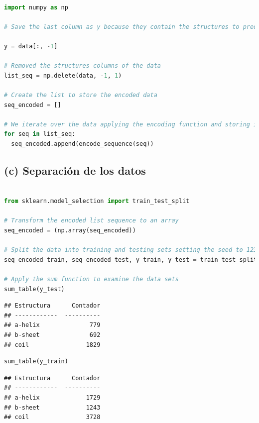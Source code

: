 \documentclass[
]{article}
\begin{document}
\begin{lstlisting}[language=Python]

import numpy as np

# Save the last column as y because they contain the structures to predict

y = data[:, -1]

# Removed the structures columns of the data
list_seq = np.delete(data, -1, 1)

# Create the list to store the encoded data
seq_encoded = []

# We iterate over the data applying the encoding function and storing it in the list
for seq in list_seq:
  seq_encoded.append(encode_sequence(seq))
\end{lstlisting}

\hypertarget{c-separaciuxf3n-de-los-datos}{%
\subsection{(c) Separación de los
datos}\label{c-separaciuxf3n-de-los-datos}}

\begin{lstlisting}[language=Python]

from sklearn.model_selection import train_test_split

# Transform the encoded list sequence to an array
seq_encoded = (np.array(seq_encoded))

# Split the data into training and testing sets setting the seed to 123
seq_encoded_train, seq_encoded_test, y_train, y_test = train_test_split(seq_encoded, y ,test_size=0.33,  random_state=123)

# Apply the sum function to examine the data sets
sum_table(y_test)
\end{lstlisting}

\begin{lstlisting}
## Estructura      Contador
## ------------  ----------
## a-helix              779
## b-sheet              692
## coil                1829
\end{lstlisting}

\begin{lstlisting}[language=Python]
sum_table(y_train)
\end{lstlisting}

\begin{lstlisting}
## Estructura      Contador
## ------------  ----------
## a-helix             1729
## b-sheet             1243
## coil                3728
\end{lstlisting}
\end{document}

